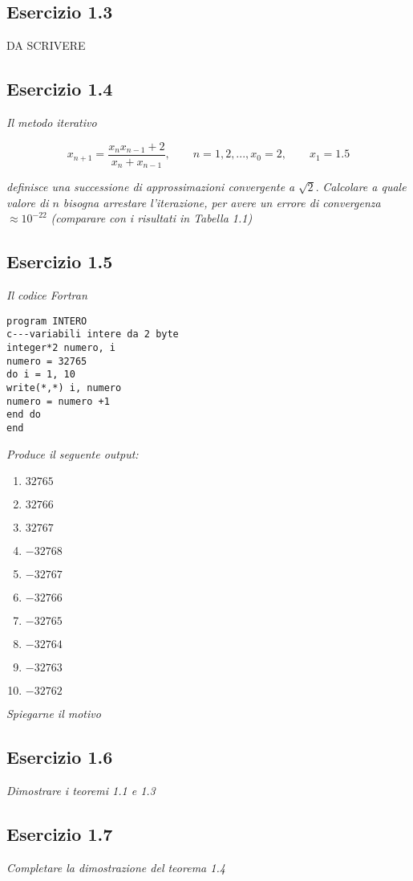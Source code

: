 \subsection{Esercizio 1.3}
DA SCRIVERE
\subsection{Esercizio 1.4}

\emph{Il metodo iterativo}

$$x_{n+1} = \frac{x_{n}x_{n-1}+2}{x_{n}+x_{n-1}}, \qquad n = 1, 2, ..., x_{0} = 2,\qquad x_{1} = 1.5 $$

\emph{definisce una successione di approssimazioni convergente a} $\sqrt{2}$. \emph{Calcolare a quale valore di $ n $ bisogna arrestare l'iterazione, per avere un errore di convergenza}
$\approx 10^{-22}$ \emph{(comparare con i risultati in Tabella 1.1)}
\subsection{Esercizio 1.5}
\emph{Il codice Fortran}
\lstset{language=[90]Fortran}
\begin{lstlisting} 
program INTERO
c---variabili intere da 2 byte
integer*2 numero, i
numero = 32765
do i = 1, 10
write(*,*) i, numero
numero = numero +1
end do 
end
\end{lstlisting}
\emph{Produce il seguente output:}
\begin{enumerate}
\item $32765$
\item $32766$
\item $32767$
\item $-32768$
\item $-32767$
\item $-32766$
\item $-32765$
\item $-32764$
\item $-32763$
\item $-32762$
\end{enumerate}
\emph{Spiegarne il motivo}




\subsection{Esercizio 1.6}
\emph{Dimostrare i teoremi 1.1 e 1.3}
\subsection{Esercizio 1.7}
\emph{Completare la dimostrazione del teorema 1.4}

